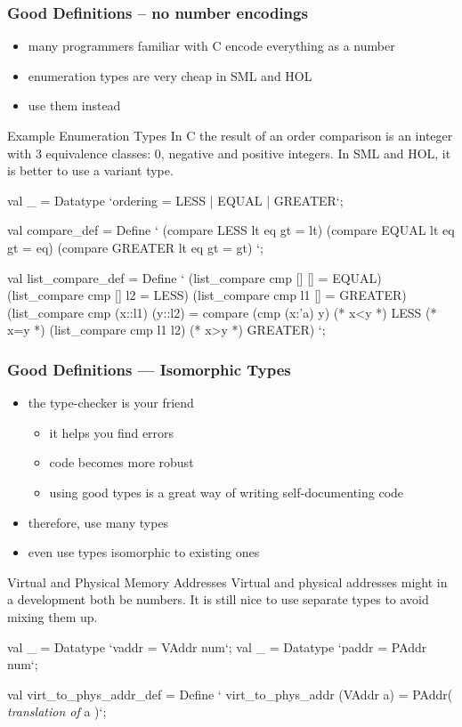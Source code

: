 \begin{frame}[fragile]
\frametitle{Good Definitions -- no number encodings}
\begin{itemize}
\item many programmers familiar with C encode everything as a number
\item enumeration types are very cheap in SML and HOL
\item use them instead
\end{itemize}

\begin{exampleblock}{Example Enumeration Types}\scriptsize
In C the result of an order comparison is an integer with 3 equivalence classes:
0, negative and positive integers. In SML and HOL, it is better to use a variant type.
\begin{semiverbatim}
val _ = Datatype `ordering = LESS | EQUAL | GREATER`;

val compare_def = Define `
   (compare LESS    lt eq gt = lt)
\holAnd{} (compare EQUAL   lt eq gt = eq)
\holAnd{} (compare GREATER lt eq gt = gt) `;

val list_compare_def = Define `
   (list_compare cmp [] [] = EQUAL) \holAnd{} (list_compare cmp [] l2 = LESS)
\holAnd{} (list_compare cmp l1 [] = GREATER)
\holAnd{} (list_compare cmp (x::l1) (y::l2) = compare (cmp (x:'a) y)
     (* x<y *) LESS
     (* x=y *) (list_compare cmp l1 l2)
     (* x>y *) GREATER) `;
\end{semiverbatim}
\end{exampleblock}   
\end{frame}


\begin{frame}[fragile]
\frametitle{Good Definitions --- Isomorphic Types}
\begin{itemize}
\item the type-checker is your friend
\begin{itemize}
\item it helps you find errors
\item code becomes more robust
\item using good types is a great way of writing self-documenting code
\end{itemize}
\item therefore, use many types
\item even use types isomorphic to existing ones
\end{itemize}

\begin{exampleblock}{Virtual and Physical Memory Addresses}\scriptsize
Virtual and physical addresses might in a development both be numbers. It is
still nice to use separate types to avoid mixing them up.
\begin{semiverbatim}
val _ = Datatype `vaddr = VAddr num`;
val _ = Datatype `paddr = PAddr num`;

val virt_to_phys_addr_def = Define `
  virt_to_phys_addr (VAddr a) = PAddr( \textrm{\textit{translation of}} a )`;
\end{semiverbatim}
\end{exampleblock}   
\end{frame}



